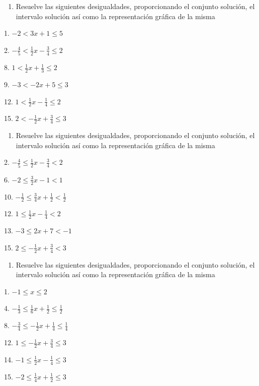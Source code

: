\documentclass[]{book}
\providecommand{\tightlist}{%
  \setlength{\itemsep}{0pt}\setlength{\parskip}{0pt}}
\begin{document}
\begin{enumerate}
\def\labelenumi{\arabic{enumi}.}
\setcounter{enumi}{14}
\tightlist
\item
  Resuelve las siguientes desigualdades, proporcionando el conjunto
  solución, el intervalo solución así como la representación gráfica de
  la misma
\end{enumerate}

\begin{multicols}{2}
1. $-2<3x+1\leq 5$

2. $-\frac{4}{5}< \frac{1}{2}x-\frac{3}{4}\leq2$

8. $1<\frac{1}{2}x+\frac{1}{3}\leq 2$

9. $-3< -2x+5\leq 3$

12. $1<\frac{1}{2}x-\frac{1}{4}\leq 2$

15. $2<-\frac{1}{2}x+\frac{3}{4}\leq 3$
\end{multicols}

\begin{enumerate}
\def\labelenumi{\arabic{enumi}.}
\setcounter{enumi}{15}
\tightlist
\item
  Resuelve las siguientes desigualdades, proporcionando el conjunto
  solución, el intervalo solución así como la representación gráfica de
  la misma
\end{enumerate}

\begin{multicols}{2}
2. $-\frac{4}{5}\leq \frac{1}{2}x-\frac{3}{4}<2$

6. $-2\leq \frac{3}{2}x-1<1$

10. $-\frac{1}{2}\leq \frac{3}{4}x+\frac{1}{2}<\frac{1}{2}$

12. $1\leq \frac{1}{2}x-\frac{1}{4}<2$

13. $-3\leq 2x+7<-1$

15. $2\leq -\frac{1}{2}x+\frac{3}{4}<3$
\end{multicols}

\begin{enumerate}
\def\labelenumi{\arabic{enumi}.}
\setcounter{enumi}{16}
\tightlist
\item
  Resuelve las siguientes desigualdades, proporcionando el conjunto
  solución, el intervalo solución así como la representación gráfica de
  la misma
\end{enumerate}

\begin{multicols}{2}
1. $-1\leq x\leq 2$

4. $-\frac{1}{3}\leq \frac{1}{6}x+\frac{1}{2}\leq \frac{1}{2}$

8. $-\frac{3}{4}\leq -\frac{1}{2}x+\frac{1}{4}\leq \frac{1}{4}$

12. $1\leq -\frac{1}{2}x+\frac{3}{4}\leq 3$

14. $-1\leq \frac{1}{2}x-\frac{1}{4}\leq 3$

15. $-2\leq \frac{1}{4}x+\frac{1}{2}\leq 3$
\end{multicols}
\end{document}
